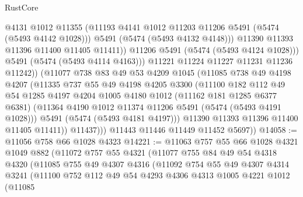 \begin{lexlean}{RustCore}
\begin{coremodule}
                          @4131
                          @1012
                          @11355
                          (@11193 @4141 @1012 @11203 @11206 @5491 (@5474 (@5493 @4142 @1028)))
                          @5491
                          (@5474 (@5493 @4132 @4148)))
                        @11390
                        @11393
                        @11396
                        @11400
                        @11405
                        @11411))
                    @11206
                    @5491
                    (@5474 (@5493 @4124 @1028)))
                  @5491
                  (@5474 (@5493 @4114 @4163)))
                @11221
                @11224
                @11227
                @11231
                @11236
                @11242))
            (@11077
              @738
              @83
              @49
              @53
              @4209
              @1045
              (@11085
                @738
                @49
                @4198
                @4207
                (@11335
                  @737
                  @55
                  @49
                  @4198
                  @4205
                  @3300
                  (@11100
                    @182
                    @112
                    @49
                    @54
                    @1285
                    @4197
                    @4204
                    @1005
                    @4180
                    @1012
                    (@11162 @181 @1285 @6377 @6381)
                    (@11364 @4190 @1012 @11374 @11206 @5491 (@5474 (@5493 @4191 @1028)))
                    @5491
                    (@5474 (@5493 @4181 @4197)))
                  @11390
                  @11393
                  @11396
                  @11400
                  @11405
                  @11411))
              @11437)))
        @11443
        @11446
        @11449
        @11452
        @5697))
@14058 := @11056 @758 @66 @1028 @4323
@14221 := @11063
    @757
    @55
    @66
    @1028
    @4321
    @1049
    @882
    (@11072
      @757
      @55
      @4321
      (@11077
        @755
        @84
        @49
        @54
        @4318
        @4320
        (@11085
          @755
          @49
          @4307
          @4316
          (@11092
            @754
            @55
            @49
            @4307
            @4314
            @3241
            (@11100
              @752
              @112
              @49
              @54
              @4293
              @4306
              @4313
              @1005
              @4221
              @1012
              (@11085

\end{coremodule}
\end{lexlean}
